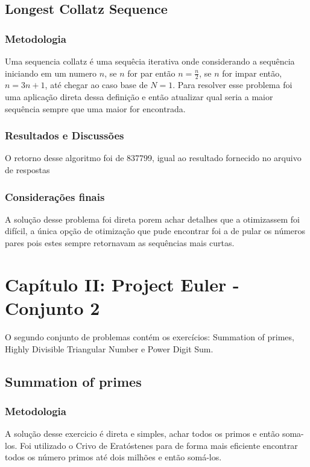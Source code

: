 \documentclass{article}
\begin{document}
    \subsection{Longest Collatz Sequence}
        
        \subsubsection{Metodologia}
        Uma sequencia collatz é uma sequêcia iterativa onde considerando a sequência iniciando em um numero $n$, se $n$ for par então $n = \frac{n}{2}$, se $n$ for impar então, $n = 3n + 1$, até chegar ao caso base de $N = 1$. Para resolver esse problema foi uma aplicação direta dessa definição e então atualizar qual seria a maior sequência sempre que uma maior for encontrada.
        
        \subsubsection{Resultados e Discussões}
        O retorno desse algoritmo foi de 837799, igual ao resultado fornecido no arquivo de respostas
        
        \subsubsection{Considerações finais}
        A solução desse problema foi direta porem achar detalhes que a otimizassem foi difícil, a única opção de otimização que pude encontrar foi a de pular os números pares pois estes sempre retornavam as sequências mais curtas.
\clearpage

\section{Capítulo II: Project Euler - Conjunto 2}
O segundo conjunto de problemas contém os exercícios: Summation of primes, Highly Divisible Triangular Number e Power Digit Sum.
    \subsection{Summation of primes}
        
        \subsubsection{Metodologia} 
        A solução desse exercicio é direta e simples, achar todos os primos e então soma-los. Foi utilizado o Crivo de Eratóstenes para de forma mais eficiente encontrar todos os número primos até dois milhões e então somá-los.
        
\end{document}
